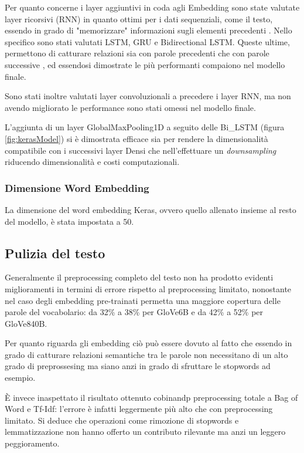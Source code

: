 Per quanto concerne i layer aggiuntivi in coda agli Embedding sono state
valutate layer ricorsivi (RNN) in quanto ottimi per i dati sequenziali, come il
testo, essendo in grado di "memorizzare" informazioni sugli elementi precedenti
\cite{liang2017text}. Nello specifico sono stati valutati LSTM, GRU e
Bidirectional LSTM. Queste ultime, permettono di catturare relazioni sia con
parole precedenti che con parole successive \cite{schuster1997bidirectional}, ed
essendosi dimostrate le più performanti compaiono nel modello finale.

Sono stati inoltre valutati layer convoluzionali a precedere i layer RNN, ma non
avendo migliorato le performance sono stati omessi nel modello finale.

L'aggiunta di un layer GlobalMaxPooling1D a seguito delle Bi\_LSTM (figura
\ref{fig:kerasModel}) si è dimostrata efficace sia per rendere la dimensionalità
compatibile con i successivi layer Densi che nell'effettuare un
\textit{downsampling} riducendo dimensionalità e costi computazionali.

\subsubsection{Dimensione Word Embedding}
La dimensione del word embedding Keras, ovvero quello allenato insieme al resto
del modello, è stata impostata a 50.

\subsection{Pulizia del testo}

Generalmente il preprocessing completo del testo non ha prodotto evidenti
miglioramenti in termini di errore rispetto al preprocessing limitato,
nonostante nel caso degli embedding pre-trainati permetta una maggiore copertura
delle parole del vocabolario: da 32\% a 38\% per GloVe6B e da 42\% a 52\% per
GloVe840B.

Per quanto riguarda gli embedding ciò può essere dovuto al fatto che essendo in
grado di catturare relazioni semantiche tra le parole non necessitano di un alto
grado di preprossesing ma siano anzi in grado di sfruttare le stopwords ad esempio.

È invece inaspettato il risultato ottenuto cobinandp preprocessing totale a Bag
of Word e Tf-Idf: l'errore è infatti leggermente più alto che con preprocessing
limitato. Si deduce che operazioni come rimozione di stopwords e lemmatizzazione
non hanno offerto un contributo rilevante ma anzi un leggero peggioramento. 

